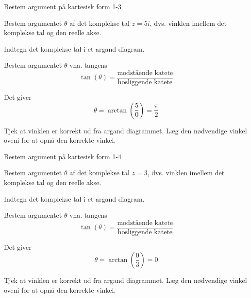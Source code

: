 \documentclass{article}
\begin{document}
\newpage

\begin{exercise}{Bestem argument på kartesisk form 1-3}
	
	Bestem argumentet $\theta$ af det komplekse tal $z=5i$, dvs. vinklen imellem det komplekse tal og den reelle akse.
	
	
	
	\hint 
	
	Indtegn det komplekse tal i et argand diagram.
	
	
	\hint
	
	Bestem argumentet $\theta$ vha. tangens
	\[
	\tan(\theta)=\frac{\textrm{modstående katete}}{\textrm{hosliggende katete}}
	\]
	
	\hint 
	
	Det giver
	\[
	\theta = \arctan \left(\frac{5}{0}\right) = \frac{\pi}{2}
	\]
	
	\hint
	
	Tjek at vinklen er korrekt ud fra argand diagrammet. Læg den nødvendige vinkel oveni for at opnå den korrekte vinkel. 
	
	
\end{exercise}

\newpage

\begin{exercise}{Bestem argument på kartesisk form 1-4}
	
	Bestem argumentet $\theta$ af det komplekse tal $z=3$, dvs. vinklen imellem det komplekse tal og den reelle akse.
	
	
	
	\hint 
	
	Indtegn det komplekse tal i et argand diagram.
	
	
	\hint
	
	Bestem argumentet $\theta$ vha. tangens
	\[
	\tan(\theta)=\frac{\textrm{modstående katete}}{\textrm{hosliggende katete}}
	\]
	
	\hint 
	
	Det giver
	\[
	\theta = \arctan \left(\frac{0}{3}\right) = 0
	\]
	
	\hint
	
	Tjek at vinklen er korrekt ud fra argand diagrammet. Læg den nødvendige vinkel oveni for at opnå den korrekte vinkel. 
	
	
\end{exercise}

\newpage
\end{document}
